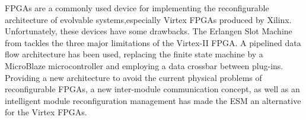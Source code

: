 
FPGAs are a commonly used device for implementing the reconfigurable architecture of evolvable systems,especially Virtex FPGAs produced by Xilinx. Unfortunately, these devices have some drawbacks. The Erlangen Slot Machine from \cite{erlangen} tackles the three major limitations of the Virtex-II FPGA. A pipelined data flow architecture has been used, replacing the finite state machine by a MicroBlaze microcontroller and employing a data crossbar between plug-ins. Providing  a new architecture to avoid the current physical problems of reconfigurable FPGAs, a new inter-module communication concept, as well as an intelligent module reconfiguration management has made the ESM an alternative for the Virtex FPGAs.
